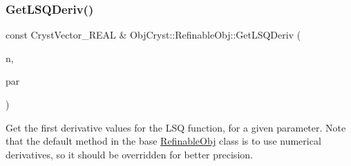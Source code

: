 \subsubsection{\texorpdfstring{GetLSQDeriv()}{GetLSQDeriv()}}
{\footnotesize\ttfamily const Cryst\+Vector\+\_\+\+R\+E\+AL \& Obj\+Cryst\+::\+Refinable\+Obj\+::\+Get\+L\+S\+Q\+Deriv (\begin{DoxyParamCaption}\item[{const unsigned int}]{n,  }\item[{\mbox{\hyperlink{class_obj_cryst_1_1_refinable_par}{Refinable\+Par}} \&}]{par }\end{DoxyParamCaption})\hspace{0.3cm}{\ttfamily [virtual]}}

Get the first derivative values for the L\+SQ function, for a given parameter. Note that the default method in the base \mbox{\hyperlink{class_obj_cryst_1_1_refinable_obj}{Refinable\+Obj}} class is to use numerical derivatives, so it should be overridden for better precision.

